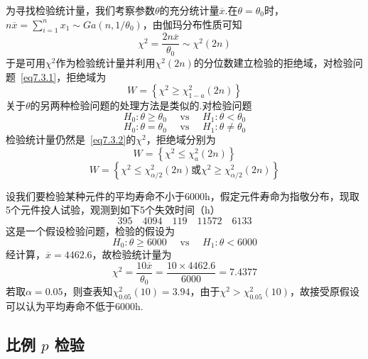 为寻找检验统计量，我们考察参数$\theta$的充分统计量$\overline { x }$.在$\theta=\theta_{ 0 }$时，$n \overline { x } = \sum _ { i = 1 } ^ { n } x _ { 1 } \sim G a \left( n , 1 / \theta _ { 0 } \right)$，由伽玛分布性质可知
\begin{equation}\label{eq7.3.2}
\chi ^ { 2 } = \frac { 2 n \overline { x } } { \theta _ { 0 } } \sim \chi ^ { 2 } ( 2 n )
\end{equation}
于是可用$\chi ^ { 2 }$作为检验统计量并利用$\chi ^ { 2 }(2n)$的分位数建立检验的拒绝域，对检验问题~\ref{eq7.3.1}，拒绝域为
\begin{equation}\label{eq7.3.3}
W = \left\{ \chi ^ { 2 } \geq \chi _ { 1 - a } ^ { 2 } ( 2 n ) \right\}
\end{equation}
关于$\theta$的另两种检验问题的处理方法是类似的.对检验问题
\begin{equation}\label{eq7.3.4}
H _ { 0 } : \theta \geq \theta _ { 0 } \quad \text { vs } \quad H _ { 1 } : \theta < \theta _ { 0 }
\end{equation}
\begin{equation}\label{eq7.3.5}
H _ { 0 } : \theta = \theta _ { 0 } \quad \text { vs } \quad H _ { 1 } : \theta \ne  \theta _ { 0 }
\end{equation}
检验统计量仍然是~\ref{eq7.3.2}的$\chi ^ { 2 }$，拒绝域分别为
\begin{equation}\label{eq7.3.6}
W = \left\{ \chi ^ { 2 } \leq \chi _ { a } ^ { 2 } ( 2 n ) \right\}
\end{equation}
\begin{equation}\label{eq7.3.7}
W=\left\{\chi^2\leq\chi_{\alpha/2}^{2}\left(2n\right)\textrm{或}\chi^2\geq\chi_{\alpha/2}^{2}\left(2n\right)\right\}
\end{equation}
\begin{example}\label{exam7.3.1}
	设我们要检验某种元件的平均寿命不小于6000h，假定元件寿命为指敬分布，现取5个元件投人试验，观测到如下5个失效时间（h）
	\[395 \quad 4094 \quad 119 \quad 11572 \quad 6133\]
	这是一个假设检验问题，检验的假设为
	\[H _ { 0 } : \theta \geq 6000 \quad \text { vs } \quad H _ { 1 } : \theta < 6000\]
	经计算，$\overline{ x }=4462.6$，故检验统计量为
	\[\chi ^ { 2 } = \frac { 10 \overline { x } } { \theta _ { 0 } } = \frac { 10 \times 4462.6 } { 6000 } = 7.4377\]
	若取$\alpha = 0.05$，则查表知$\chi _ { 0.05 } ^ { 2 } ( 10 ) = 3.94$，由于$\chi^{2}>\chi _ { 0.05 } ^ { 2 } ( 10 ) $，故接受原假设可以认为平均寿命不低于6000h.
\end{example}

\subsection{比例 $p$ 检验\label{sec:7.3.2}}

